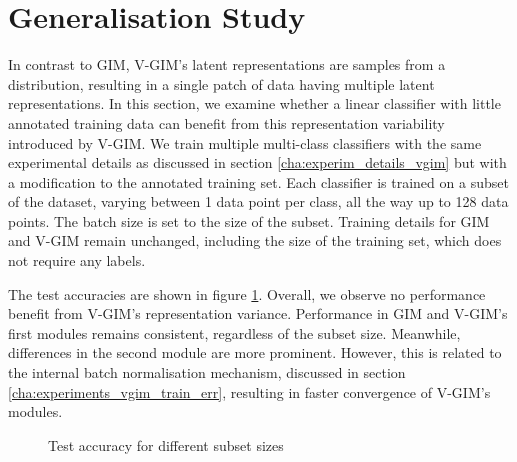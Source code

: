 	\section{Generalisation Study} \label{cha:generalisation_study}
		In contrast to GIM, V-GIM's latent representations are samples from a distribution, resulting in a single patch of data having multiple latent representations. In this section, we examine whether a linear classifier with little annotated training data can benefit from this representation variability introduced by V-GIM. We train multiple multi-class classifiers with the same experimental details as discussed in section \ref{cha:experim_details_vgim} but with a modification to the annotated training set. Each classifier is trained on a subset of the dataset, varying between 1 data point per class, all the way up to 128 data points. The batch size is set to the size of the subset. Training details for GIM and V-GIM remain unchanged, including the size of the training set, which does not require any labels.
		
		The test accuracies are shown in figure \ref{fig:subsets_experiment}. Overall, we observe no performance benefit from V-GIM's representation variance. Performance in GIM and V-GIM's first modules remains consistent, regardless of the subset size. Meanwhile, differences in the second module are more prominent. However, this is related to the internal batch normalisation mechanism, discussed in section \ref{cha:experiments_vgim_train_err}, resulting in faster convergence of V-GIM's modules.
		
		\begin{figure}[h] %
			\centering
			\begin{subfigure}[b]{0.4\textwidth}
				\centering
				
			\end{subfigure}
			\hfill
			\begin{subfigure}[b]{0.4\textwidth}
				\centering
				
			\end{subfigure}
			\caption{Test accuracy for different subset sizes}
			\label{fig:subsets_experiment}
		\end{figure}






	


